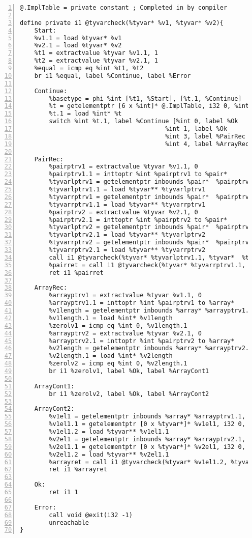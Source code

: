 \begin{lstlisting}[frame=single,numbers=left, language={[x86masm]Assembler}, caption={[LLVM tyvarcheck]LLVM IR for the typevarcheck function.},
label=lst:tyvarcheck]
@.ImplTable = private constant ; Completed in by compiler

define private i1 @tyvarcheck(%tyvar* %v1, %tyvar* %v2){
	Start:
	%v1.1 = load %tyvar* %v1
	%v2.1 = load %tyvar* %v2
	%t1 = extractvalue %tyvar %v1.1, 1
	%t2 = extractvalue %tyvar %v2.1, 1
	%equal = icmp eq %int %t1, %t2
	br i1 %equal, label %Continue, label %Error

	Continue:
		%basetype = phi %int [%t1, %Start], [%t.1, %Continue]
		%t = getelementptr [6 x %int]* @.ImplTable, i32 0, %int %basetype
		%t.1 = load %int* %t
		switch %int %t.1, label %Continue [%int 0, label %Ok
										%int 1, label %Ok
									 	%int 3, label %PairRec
									 	%int 4, label %ArrayRec]

	PairRec:
		%pairptrv1 = extractvalue %tyvar %v1.1, 0
		%pairptrv1.1 = inttoptr %int %pairptrv1 to %pair*
		%tyvarlptrv1 = getelementptr inbounds %pair*  %pairptrv1.1, i32 0, i32 0
		%tyvarlptrv1.1 = load %tyvar** %tyvarlptrv1
		%tyvarrptrv1 = getelementptr inbounds %pair*  %pairptrv1.1, i32 0, i32 0
		%tyvarrptrv1.1 = load %tyvar** %tyvarrptrv1
		%pairptrv2 = extractvalue %tyvar %v2.1, 0
		%pairptrv2.1 = inttoptr %int %pairptrv2 to %pair*
		%tyvarlptrv2 = getelementptr inbounds %pair*  %pairptrv2.1, i32 0, i32 0
		%tyvarlptrv2.1 = load %tyvar** %tyvarlptrv2
		%tyvarrptrv2 = getelementptr inbounds %pair*  %pairptrv2.1, i32 0, i32 0
		%tyvarrptrv2.1 = load %tyvar** %tyvarrptrv2
		call i1 @tyvarcheck(%tyvar* %tyvarlptrv1.1, %tyvar*  %tyvarlptrv2.1)
		%pairret = call i1 @tyvarcheck(%tyvar* %tyvarrptrv1.1, %tyvar*  %tyvarrptrv2.1)
		ret i1 %pairret

	ArrayRec:
		%arrayptrv1 = extractvalue %tyvar %v1.1, 0
		%arrayptrv1.1 = inttoptr %int %pairptrv1 to %array*
		%v1length = getelementptr inbounds %array* %arrayptrv1.1, i32 0, i32 0
		%v1length.1 = load %int* %v1length
		%zerolv1 = icmp eq %int 0, %v1length.1
		%arrayptrv2 = extractvalue %tyvar %v2.1, 0
		%arrayptrv2.1 = inttoptr %int %pairptrv2 to %array*
		%v2length = getelementptr inbounds %array* %arrayptrv2.1, i32 0, i32 0
		%v2length.1 = load %int* %v2length
		%zerolv2 = icmp eq %int 0, %v2length.1
		br i1 %zerolv1, label %Ok, label %ArrayCont1

	ArrayCont1:
		br i1 %zerolv2, label %Ok, label %ArrayCont2

	ArrayCont2:
		%v1el1 = getelementptr inbounds %array* %arrayptrv1.1, i32 0, i32 1
		%v1el1.1 = getelementptr [0 x %tyvar*]* %v1el1, i32 0, i32 0
		%v1el1.2 = load %tyvar** %v1el1.1
		%v2el1 = getelementptr inbounds %array* %arrayptrv2.1, i32 0, i32 1
		%v2el1.1 = getelementptr [0 x %tyvar*]* %v2el1, i32 0, i32 0
		%v2el1.2 = load %tyvar** %v2el1.1
		%arrayret = call i1 @tyvarcheck(%tyvar* %v1el1.2, %tyvar* %v2el1.2)
		ret i1 %arrayret

	Ok:
		ret i1 1

	Error:
		call void @exit(i32 -1)
  		unreachable
}\end{lstlisting}
